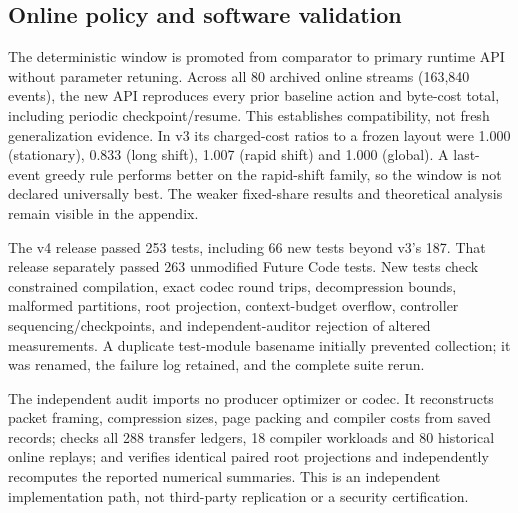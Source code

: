\subsection{Online policy and software validation}
The deterministic window is promoted from comparator to primary runtime API without parameter retuning. Across all 80 archived online streams (163,840 events), the new API reproduces every prior baseline action and byte-cost total, including periodic checkpoint/resume. This establishes compatibility, not fresh generalization evidence. In v3 its charged-cost ratios to a frozen layout were 1.000 (stationary), 0.833 (long shift), 1.007 (rapid shift) and 1.000 (global). A last-event greedy rule performs better on the rapid-shift family, so the window is not declared universally best. The weaker fixed-share results and theoretical analysis remain visible in the appendix.

The v4 release passed 253 tests, including 66 new tests beyond v3's 187. That release separately passed 263 unmodified Future Code tests. New tests check constrained compilation, exact codec round trips, decompression bounds, malformed partitions, root projection, context-budget overflow, controller sequencing/checkpoints, and independent-auditor rejection of altered measurements. A duplicate test-module basename initially prevented collection; it was renamed, the failure log retained, and the complete suite rerun.

The independent audit imports no producer optimizer or codec. It reconstructs packet framing, compression sizes, page packing and compiler costs from saved records; checks all 288 transfer ledgers, 18 compiler workloads and 80 historical online replays; and verifies identical paired root projections and independently recomputes the reported numerical summaries. This is an independent implementation path, not third-party replication or a security certification.
